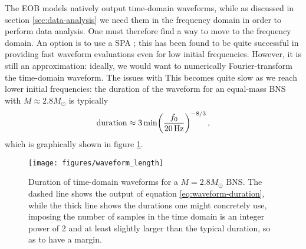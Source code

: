 \documentclass[main.tex]{subfiles}
\begin{document}

The \ac{EOB} models natively output time-domain waveforms, while as discussed in section \ref{sec:data-analysis} we need them in the frequency domain in order to perform data analysis. 
One must therefore find a way to move to the frequency domain. An option is to use a \ac{SPA} \cite{gambaFastFaithfulFrequencydomain2020}; this has been found to be quite successful in providing fast waveform evaluations even for low initial frequencies. 
However, it is still an approximation: ideally, we would want to numerically Fourier-transform the time-domain waveform. 
The issues with  
This becomes quite slow as we reach lower initial frequencies: the duration of the waveform for an equal-mass \ac{BNS} with \(M \approx 2.8 M_{\odot}\) is typically \cite[eq.\ 4.21]{maggioreGravitationalWavesVolume2007}
%
\begin{align} \label{eq:waveform-duration}
\text{duration} \approx \SI{3}{min} \qty(\frac{f_0 }{\SI{20}{Hz}})^{-8/3}
\,,
\end{align}
%
which is graphically shown in figure \ref{fig:waveform_length}. 

\begin{figure}[ht]
\centering
\texttt{[image: figures/waveform\_length]}
\caption{Duration of time-domain waveforms for a \(M = 2.8 M_{\odot}\) \ac{BNS}. The dashed line shows the output of equation \eqref{eq:waveform-duration}, while the thick line shows the durations one might concretely use, imposing the number of samples in the time domain is an integer power of 2 and at least slightly larger than the typical duration, so as to have a margin.}
\label{fig:waveform_length}
\end{figure}




\end{document}
